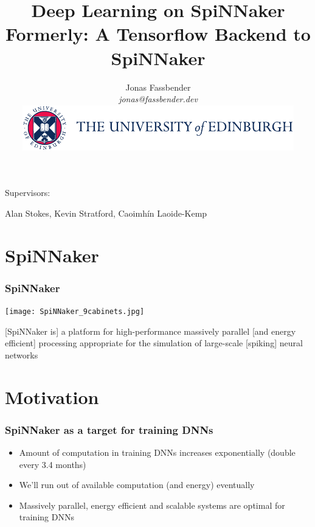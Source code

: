 \documentclass[xcolor=x11names,compress,usenames,dvipsnames,mathsans]{beamer}
\title{Deep Learning on SpiNNaker \\
  Formerly: A Tensorflow Backend to SpiNNaker}
\author[author]{Jonas Fassbender \\
\textit{jonas@fassbender.dev} \\
\vspace{1em}
\includegraphics[scale=.8]{logo_colour.pdf}
}
\date{}
\begin{document}
\begin{frame}
  \titlepage
  \vspace{-2cm}

  \begin{center}
  Supervisors:

  Alan Stokes, Kevin Stratford, Caoimhín Laoide-Kemp
  \end{center}
\end{frame}

\section{SpiNNaker}

\begin{frame}[fragile]
  \frametitle{SpiNNaker}

  \begin{center}
    \texttt{[image: SpiNNaker\_9cabinets.jpg]}
  \end{center}

  [SpiNNaker is] a platform for high-performance massively
  parallel [and energy efficient] processing appropriate
  for the simulation of large-scale [spiking] neural
  networks \cite{spinnaker_project}

\end{frame}

\section{Motivation}

\begin{frame}[fragile]
  \frametitle{SpiNNaker as a target for training DNNs}

  \begin{itemize}[<+->]
    \item Amount of computation in training DNNs
          increases exponentially (double every 3.4 months)
          \cite{openai2019}
    \item We'll run out of available computation (and
          energy) eventually
    \item Massively parallel, energy efficient and scalable
          systems are optimal for training DNNs
  \end{itemize}
\end{frame}

\end{document}
